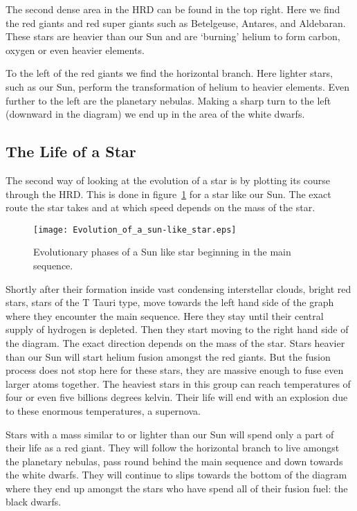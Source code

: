 The second dense area in the HRD can be found in the top right. Here we find the red giants and red super giants such as Betelgeuse, Antares, and Aldebaran. These stars are heavier than our Sun and are `burning' helium to form carbon, oxygen or even heavier elements.

To the left of the red giants we find the horizontal branch. Here lighter stars, such as our Sun, perform the transformation of helium to heavier elements. Even further to the left are the planetary nebulas. Making a sharp turn to the left (downward in the diagram) we end up in the area of the white dwarfs.

\subsection{The Life of a Star}
The second way of looking at the evolution of a star is by plotting its course through the HRD. This is done in figure~\ref{fig:HRD_2} for a star like our Sun. The exact route the star takes and at which speed depends on the mass of the star.

\begin{figure}\begin{center}
\texttt{[image: Evolution\_of\_a\_sun-like\_star.eps]}
\caption{Evolutionary phases of a Sun like star beginning in the main sequence.\protect\footnotemark}\label{fig:HRD_2}
\end{center}\end{figure}

Shortly after their formation inside vast condensing interstellar clouds, bright red stars, stars of the T Tauri type, move towards the left hand side of the graph where they encounter the main sequence. Here they stay until their central supply of hydrogen is depleted. Then they start moving to the right hand side of the diagram. The exact direction depends on the mass of the star. Stars heavier than our Sun will start helium fusion amongst the red giants. But the fusion process does not stop here for these stars, they are massive enough to fuse even larger atoms together. The heaviest stars in this group can reach temperatures of four or even five billions degrees kelvin. Their life will end with an explosion due to these enormous temperatures, a supernova. 

Stars with a mass similar to or lighter than our Sun will spend only a part of their life as a red giant. They will follow the horizontal branch to live amongst the planetary nebulas, pass round behind the main sequence and down towards the white dwarfs. They will continue to slips towards the bottom of the diagram where they end up amongst the stars who have spend all of their fusion fuel: the black dwarfs.

